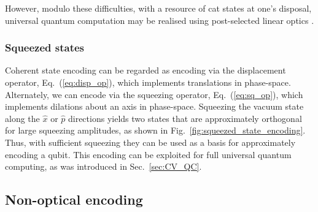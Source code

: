 However, modulo these difficulties, with a resource of cat states at one's disposal, universal quantum computation may be realised using post-selected linear optics \cite{bib:JeongRalph05, bib:Gilchrist04}.

%
%

\subsubsection{Squeezed states}

Coherent state encoding can be regarded as encoding via the displacement operator, Eq.~(\ref{eq:disp_op}), which implements translations in phase-space. Alternately, we can encode via the squeezing operator, Eq.~(\ref{eq:sq_op}), which implements dilations about an axis in phase-space. Squeezing the vacuum state along the $\hat{x}$ or $\hat{p}$ directions yields two states that are approximately orthogonal for large squeezing amplitudes, as shown in Fig.~\ref{fig:squeezed_state_encoding}. Thus, with sufficient squeezing they can be used as a basis for approximately encoding a qubit. This encoding can be exploited for full universal quantum computing, as was introduced in Sec.~\ref{sec:CV_QC}.

%
%

\subsection{Non-optical encoding}

